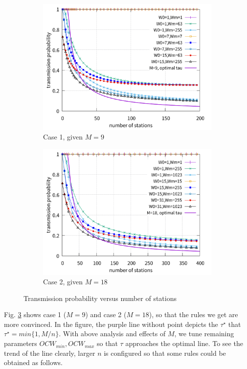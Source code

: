 \documentclass[journal]{IEEEtran}
\begin{document}
\begin{figure}[!ht]
\centering
\begin{subfigure}{0.5\textwidth}
\includegraphics[scale=.38]{./figure/Section_perf_eval/tau/n_tau_perf_M9_x200.pdf}
\caption{Case 1, given $M=9$}
\label{fig_tau_n_M9}
\end{subfigure}
\begin{subfigure}{0.5\textwidth}
\includegraphics[scale=.38]{./figure/Section_perf_eval/tau/n_tau_perf_M18_x400.pdf}
\caption{Case 2, given $M=18$}
\label{fig_tau_n_M18}
\end{subfigure}
\caption{Transmission probability versus number of stations}
\label{fig_tau_n}
\end{figure}
Fig. \ref{fig_tau_n} shows case 1 ($M=9$) and case 2 ($M=18$), so that the rules we get are more convinced.
In the figure, the purple line without point depicts the $\tau^\star$ that $\tau^\star = min\lbrace 1, M/n \rbrace$.
With above analysis and effects of $M$, we tune remaining parameters $OCW_{min}, OCW_{max}$ so that $\tau$ approaches the optimal line. 
To see the trend of the line clearly, larger $n$ is configured so that some rules could be obtained as follows.
\end{document}
